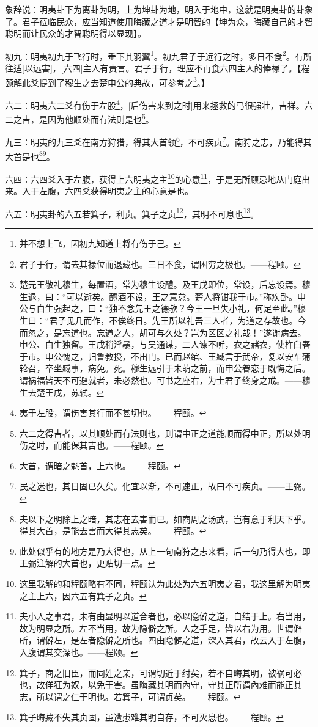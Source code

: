 \documentclass[12pt,oneside]{book}
\begin{document}
象辞说：明夷卦下为离卦为明，上为坤卦为地，明入于地中，这就是明夷卦的卦象了。君子莅临民众，应当知道使用晦藏之道才是明智的【坤为众，晦藏自己的才智聪明而让民众的才智聪明得以显现】。

初九：明夷初九于飞行时，垂下其羽翼\footnote{并不想上飞，因初九知道上将有伤于己。}。初九君子于远行之时，多日不食\footnote{君子于行，谓去其禄位而退藏也。三日不食，谓困穷之极也。——程颐。}。有所往适[以远害]，[六四]主人有责言。君子于行，理应不再食六四主人的俸禄了。【程颐解此爻提到了穆生之去楚申公的典故，可参考之\footnote{楚元王敬礼穆生，每置酒，常为穆生设醴。及王戊即位，常设，后忘设焉。穆生退，曰：“可以逝矣。醴酒不设，王之意怠。楚人将钳我于市。”称疾卧。申公与白生强起之，曰：“独不念先王之德欤？今王一旦失小礼，何足至此。”穆生曰：“君子见几而作，不俟终日。先王所以礼吾三人者，为道之存故也。今而忽之，是忘道也。忘道之人，胡可与久处？岂为区区之礼哉！”遂谢病去。申公、白生独留。王戊稍淫暴，与吴通谋，二人谏不听，衣之赭衣，使杵臼舂于市。申公愧之，归鲁教授，不出门。已而赵绾、王臧言于武帝，复以安车蒲轮召，卒坐臧事，病免。死。穆生远引于未萌之前，而申公眷恋于既悔之后。谓祸福皆天不可避就者，未必然也。可书之座右，为士君子终身之戒。——穆生去楚王戊，苏轼。}。】

六二：明夷六二爻有伤于左股\footnote{夷于左股，谓伤害其行而不甚切也。——程颐。}，[后伤害来到之时]用来拯救的马很强壮，吉祥。六二之吉，是因为他顺处而有法则是也\footnote{六二之得吉者，以其顺处而有法则也，则谓中正之道能顺而得中正，所以处明伤之时，而能保其吉也。——程颐。}。

九三：明夷的九三爻在南方狩猎，得其大首领\footnote{大首，谓暗之魁首，上六也。——程颐。}，不可疾贞\footnote{民之迷也，其日固已久矣。化宜以渐，不可速正，故曰不可疾贞。——王弼。}。南狩之志，乃能得其大首是也\footnote{夫以下之明除上之暗，其志在去害而已。如商周之汤武，岂有意于利天下乎。得其大首，是能去害而大得其志矣。——程颐。}\footnote{此处似乎有的地方是乃大得也，从上一句南狩之志来看，后一句乃得大也，即王弼注解的大首也，更贴切一点。}。

六四：六四爻入于左腹，获得上六明夷之主\footnote{这里我解的和程颐略有不同，程颐认为此处为六五明夷之君，我这里解为明夷之主上六，因六五有箕子之贞。}的心意\footnote{夫小人之事君，未有由显明以道合者也，必以隐僻之道，自结于上。右当用，故为明显之所。左不当用，故为隐僻之所。人之手足，皆以右为用。世谓僻所，谓僻左，是左者隐僻之所也。四由隐僻之道，深入其君，故云入于左腹，入腹谓其交深也。——程颐。}，于是无所顾忌地从门庭出来。入于左腹，六四爻获得明夷之主的心意是也。

六五：明夷卦的六五若箕子，利贞。箕子之贞\footnote{箕子，商之旧臣，而同姓之亲，可谓切近于纣矣，若不自晦其明，被祸可必也，故佯狂为奴，以免于害。虽晦藏其明而內守，守其正所谓內难而能正其志，所以谓之仁于明也。若箕子，可谓贞矣。——程颐。}，其明不可息也\footnote{箕子晦藏不失其贞固，虽遭患难其明自存，不可灭息也。——程颐。}。
\end{document}
